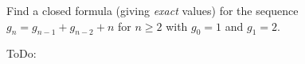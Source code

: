 Find a closed formula (giving \textit{exact} values) for the sequence $g_n = g_{n-1} + g_{n-2} + n$ for $n\ge2$ with $g_0=1$ and $g_1=2$.
\begin{framed}
	ToDo:
\end{framed}